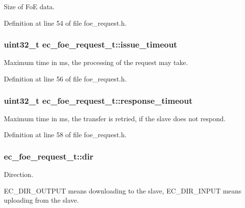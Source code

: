 Size of Fo\-E data. 



Definition at line 54 of file foe\-\_\-request.\-h.

\subsubsection[{issue\-\_\-timeout}]{\setlength{\rightskip}{0pt plus 5cm}uint32\-\_\-t ec\-\_\-foe\-\_\-request\-\_\-t\-::issue\-\_\-timeout}\label{structec__foe__request__t_a313c264273fbc3dc6b7aa4a177dd1505}


Maximum time in ms, the processing of the request may take. 



Definition at line 56 of file foe\-\_\-request.\-h.

\subsubsection[{response\-\_\-timeout}]{\setlength{\rightskip}{0pt plus 5cm}uint32\-\_\-t ec\-\_\-foe\-\_\-request\-\_\-t\-::response\-\_\-timeout}\label{structec__foe__request__t_a347a7ba58a6616319766bc65e2957ef9}


Maximum time in ms, the transfer is retried, if the slave does not respond. 



Definition at line 58 of file foe\-\_\-request.\-h.

\subsubsection[{dir}]{ ec\-\_\-foe\-\_\-request\-\_\-t\-::dir}\label{structec__foe__request__t_a28940cc34e5ddb8a960cc459040bbcc9}


Direction. 

E\-C\-\_\-\-D\-I\-R\-\_\-\-O\-U\-T\-P\-U\-T means downloading to the slave, E\-C\-\_\-\-D\-I\-R\-\_\-\-I\-N\-P\-U\-T means uploading from the slave. 

